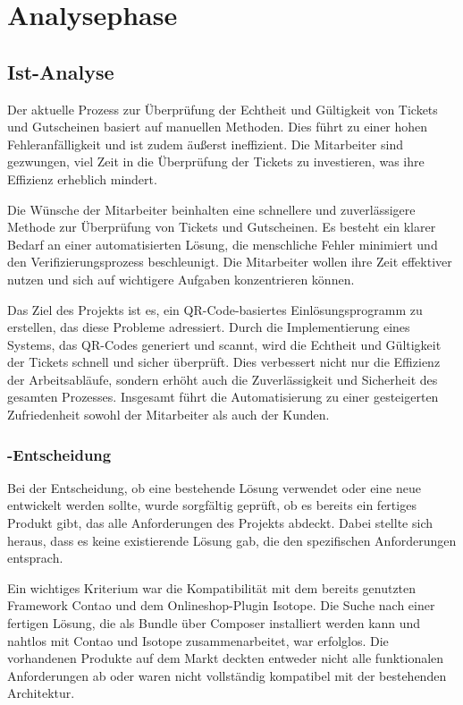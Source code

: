 \section{Analysephase} 
\label{sec:Analysephase}


\subsection{Ist-Analyse} 
\label{sec:IstAnalyse}

Der aktuelle Prozess zur Überprüfung der Echtheit und Gültigkeit von Tickets und Gutscheinen basiert auf manuellen Methoden. Dies führt zu einer hohen Fehleranfälligkeit und ist zudem äußerst ineffizient. Die Mitarbeiter sind gezwungen, viel Zeit in die Überprüfung der Tickets zu investieren, was ihre Effizienz erheblich mindert.

Die Wünsche der Mitarbeiter beinhalten eine schnellere und zuverlässigere Methode zur Überprüfung von Tickets und Gutscheinen. Es besteht ein klarer Bedarf an einer automatisierten Lösung, die menschliche Fehler minimiert und den Verifizierungsprozess beschleunigt. Die Mitarbeiter wollen ihre Zeit effektiver nutzen und sich auf wichtigere Aufgaben konzentrieren können.

Das Ziel des Projekts ist es, ein QR-Code-basiertes Einlösungsprogramm zu erstellen, das diese Probleme adressiert. Durch die Implementierung eines Systems, das QR-Codes generiert und scannt, wird die Echtheit und Gültigkeit der Tickets schnell und sicher überprüft. Dies verbessert nicht nur die Effizienz der Arbeitsabläufe, sondern erhöht auch die Zuverlässigkeit und Sicherheit des gesamten Prozesses. Insgesamt führt die Automatisierung zu einer gesteigerten Zufriedenheit sowohl der Mitarbeiter als auch der Kunden.

\subsubsection{-Entscheidung}
\label{sec:MakeOrBuyEntscheidung}

Bei der Entscheidung, ob eine bestehende Lösung verwendet oder eine neue entwickelt werden sollte, wurde sorgfältig geprüft, ob es bereits ein fertiges Produkt gibt, das alle Anforderungen des Projekts abdeckt. Dabei stellte sich heraus, dass es keine existierende Lösung gab, die den spezifischen Anforderungen entsprach.

Ein wichtiges Kriterium war die Kompatibilität mit dem bereits genutzten Framework Contao und dem Onlineshop-Plugin Isotope. Die Suche nach einer fertigen Lösung, die als Bundle über Composer installiert werden kann und nahtlos mit Contao und Isotope zusammenarbeitet, war erfolglos. Die vorhandenen Produkte auf dem Markt deckten entweder nicht alle funktionalen Anforderungen ab oder waren nicht vollständig kompatibel mit der bestehenden Architektur.

